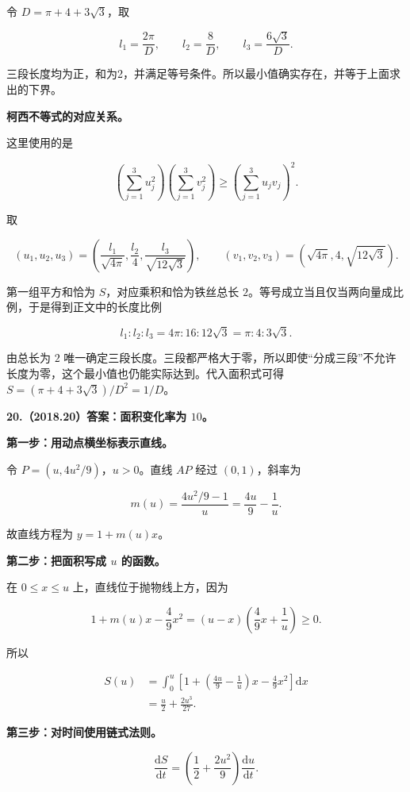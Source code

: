 \documentclass[UTF8,11pt,fontset=windows]{ctexart}
\begin{document}
令 $D=\pi+4+3\sqrt3$，取

$$
l_1=\frac{2\pi}{D},\qquad
l_2=\frac8D,\qquad
l_3=\frac{6\sqrt3}{D}.
$$

三段长度均为正，和为2，并满足等号条件。所以最小值确实存在，并等于上面求出的下界。

\textbf{柯西不等式的对应关系。}

这里使用的是

$$
\left(\sum_{j=1}^3u_j^2\right)
\left(\sum_{j=1}^3v_j^2\right)
\ge\left(\sum_{j=1}^3u_jv_j\right)^2.
$$

取

$$
(u_1,u_2,u_3)=\left(\frac{l_1}{\sqrt{4\pi}},\frac{l_2}{4},\frac{l_3}{\sqrt{12\sqrt3}}\right),
\qquad
(v_1,v_2,v_3)=\left(\sqrt{4\pi},4,\sqrt{12\sqrt3}\right).
$$

第一组平方和恰为 $S$，对应乘积和恰为铁丝总长 $2$。等号成立当且仅当两向量成比例，于是得到正文中的长度比例

$$
l_1:l_2:l_3=4\pi:16:12\sqrt3=\pi:4:3\sqrt3.
$$

由总长为 $2$ 唯一确定三段长度。三段都严格大于零，所以即使“分成三段”不允许长度为零，这个最小值也仍能实际达到。代入面积式可得 $S=(\pi+4+3\sqrt3)/D^2=1/D$。

\clearpage

\textbf{20.（2018.20）答案：面积变化率为 $10$。}

\textbf{第一步：用动点横坐标表示直线。}

令 $P=(u,4u^2/9)$，$u>0$。直线 $AP$ 经过 $(0,1)$，斜率为

$$
m(u)=\frac{4u^2/9-1}{u}=\frac{4u}{9}-\frac1u.
$$

故直线方程为 $y=1+m(u)x$。

\textbf{第二步：把面积写成 $u$ 的函数。}

在 $0\le x\le u$ 上，直线位于抛物线上方，因为

$$
1+m(u)x-\frac49x^2
=(u-x)\left(\frac49x+\frac1u\right)\ge0.
$$

所以

$$
\begin{aligned}
S(u)&=\int_0^u\left[1+\left(\frac{4u}{9}-\frac1u\right)x-\frac49x^2\right]\mathrm dx\\
&=\frac u2+\frac{2u^3}{27}.
\end{aligned}
$$

\textbf{第三步：对时间使用链式法则。}

$$
\frac{\mathrm dS}{\mathrm dt}
=\left(\frac12+\frac{2u^2}{9}\right)\frac{\mathrm du}{\mathrm dt}.
$$
\end{document}
